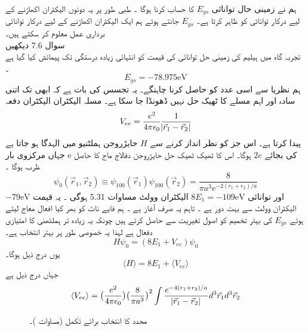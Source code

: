 ہم نے زمینی حال توانائی 
 \(E_{gs}\)
 کا حساب کرنا ہوگا ۔ طبی طور پر یہ دونوں الیکٹران اکھاڑنے کے لیے درکار توانائی کو ظاہر کرتا ہے۔ 
 \(E_{gs}\)
  جانتے ہوئے ہم ایک الیکٹران اکھاڑنے کے لیے درکار توانائی برداری عمل معلوم کر سکتے ہیں۔\\
سوال 7.6 دیکھیں\\ 
تجربہ گاہ میں ہیلیم کی زمینی حل توانائی کی قیمت کو انتہائی زیادہ درستگی تک پیمائش کیا گیا ہے ۔
\[E_{gs}=-78.975 \text{eV}\]
ہم نظریا سے اسی عدد کو حاصل کرنا چاہنگے۔ یہ تجسس کی بات ہے کہ ابھی تک اتنی سادہ اور اہم مسلے کا ٹھیک حل نہیں ڈھونڈا جا سکا ہے۔
مسلہ الیکٹران الیکٹران دفعہ 
\[V_{ee}=\frac{e^{2}}{4\pi\epsilon_{0}}\frac{1}{\abs{\vec{r}_{1}-\vec{r}_{2}}}\]
پیدا کرتا ہے۔ اس جز کو نظر انداز کرنے سے
 \(H \)
حایڑروجن ہملٹنیو میں الہدگا ہو جاتا ہے جہاں مرکزوی بار e کی بجائے
 \(2e\)
 ہوگا۔ اس کا ٹھیک ٹھیک حل حایڑروجن دفالاج ماج کا حاصل ظرب ہوگا ۔
\[\psi_{0}(\vec{r}_{1},\vec{r}_{2})\equiv \psi_{100}(\vec{r}_{1})\psi_{100}(\vec{r}_{2})=\frac{8}{\pi a^{3}e^{-2(r_{1}+r_{2})/a}}\]
اور توانائی
 \(8E_{1}=-109\text{eV}\)
 الیکٹران وولٹ 
مساوات 5.31 ہوگی ۔ یہ قیمت
 \(-79\text{eV}\) 
 الیکٹران وولٹ سے بہت دور ہے ۔ تاہم یہ صرف آغاز ہے ۔ ہم فایے ناٹ کو بھر کیا افعال معاج لیتے ہوئے 
 \(E_{gs}\)
 کی بہتر تخمیم کو اصول تغیریت سے حاصل کرتے ہیں چونکہ یہ زیادہ تر ہملٹھنی کا امتیازی دفعال ہے لہذا یہ خصوصی طور پر بہتر انتخاب ہے۔
\[H\psi_{0}=(8E_{1}+V_{ee})\psi_{0}\]
یوں درج ذیل ہوگا۔ 
\[\langle H \rangle=8E_{1}+\langle V_{ee}\rangle\]
جہاں درج ذیل ہے 
\[\langle V_{ee}\rangle=\big(\frac{e^{2}}{4\pi\epsilon_{0}}\big )\big (\frac{8}{\pi a^{3}}\big )^{2}\int \frac{e^{-4(r_{1}+r_{2})/a}}{\abs{\vec{r}_{1}-\vec{r}_{2}}}d^{3}\vec{r}_{1}d^{3}\vec{r}_{2}\]

\begin{figure}
\centering
{}
\caption{محدد کا انتخاب برائے  تکمل (مساوات )۔}
\label{شکل_تغیریت_محدد_انتخاب_رداس_دوم_تکمل}
\end{figure}


